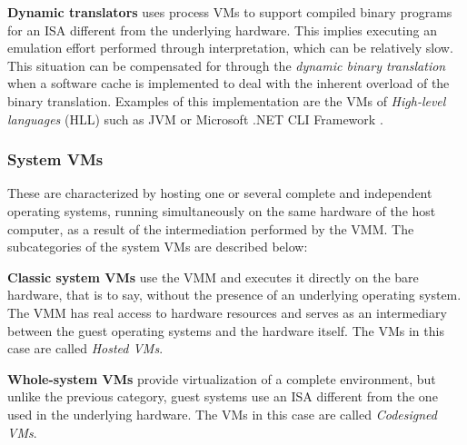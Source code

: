 	\textbf{Dynamic translators} uses process VMs to support compiled binary programs for an ISA different from the underlying hardware. This implies executing an emulation effort performed through interpretation, which can be relatively slow. This situation can be compensated for through the \textit{dynamic binary translation} when a software cache is implemented to deal with the inherent overload of the binary translation. Examples of this implementation are the VMs of \textit{High-level languages} (HLL)  such as JVM \cite{Lindholm1997} or Microsoft .NET CLI Framework \cite{Fisher2006} \cite{Thai2003}.

	
	\subsubsection{System VMs}
	
	These are characterized by hosting one or several complete and independent operating systems, running simultaneously on the same hardware of the host computer, as a result of the intermediation performed by the VMM. The subcategories of the system VMs are described below:
	
	
		

	\textbf{Classic system VMs} use the VMM and executes it directly on the bare hardware, that is to say, without the presence of an underlying operating system. The VMM  has real access to hardware resources and serves as an intermediary between the guest operating systems and the hardware itself. The VMs in this case are called \textit{Hosted VMs}.
		
	\textbf{Whole-system VMs} provide virtualization of a complete environment, but unlike the previous category, guest systems use an ISA different from the one used in the underlying hardware. The VMs in this case are called \textit{Codesigned VMs}.


